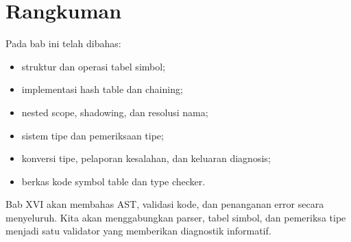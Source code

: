 \section*{Rangkuman}

Pada bab ini telah dibahas:
\begin{itemize}[leftmargin=*]
  \item struktur dan operasi tabel simbol;
  \item implementasi hash table dan chaining;
  \item nested scope, shadowing, dan resolusi nama;
  \item sistem tipe dan pemeriksaan tipe;
  \item konversi tipe, pelaporan kesalahan, dan keluaran diagnosis;
  \item berkas kode symbol table dan type checker.
\end{itemize}

Bab XVI akan membahas AST, validasi kode, dan penanganan error
secara menyeluruh. Kita akan menggabungkan parser, tabel simbol, dan
pemeriksa tipe menjadi satu validator yang memberikan diagnostik
informatif.
